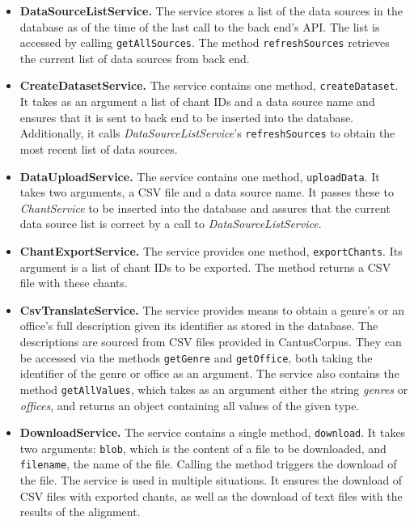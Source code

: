 \begin{itemize}
\item\textbf{DataSourceListService.} The service stores a list of the data sources in the database as of the time of the last call to the back end's API. The list
is accessed by calling \verb|getAllSources|. The method \verb|refreshSources| retrieves the current list of data sources from back end.

\item\textbf{CreateDatasetService.} The service contains one method, \verb|createDataset|. It takes as an argument a list of chant IDs and a data source name and
ensures that it is sent to back end to be inserted into the database. Additionally, it calls \emph{DataSourceListService}'s \verb|refreshSources| to obtain the
most recent list of data sources.

\item\textbf{DataUploadService.} The service contains one method, \verb|uploadData|. It takes two arguments, a CSV file and a data source name. It passes these to \emph{ChantService}
to be inserted into the database and assures that the current data source list is correct by a call to \emph{DataSourceListService}.

\item\textbf{ChantExportService.} The service provides one method, \verb|exportChants|. Its argument is a list of chant IDs to be exported. The method returns a CSV
file with these chants.

\item\textbf{CsvTranslateService.} The service provides means to obtain a genre's or an office's full description given its identifier as stored in the database.
The descriptions are sourced from CSV files provided in CantusCorpus. They can be accessed via the methods \verb|getGenre| and \verb|getOffice|, both
taking the identifier of the genre or office as an argument. The service also contains the method \verb|getAllValues|, which takes as an argument either
the string \emph{genres} or \emph{offices}, and returns an object containing all values of the given type.

\item\textbf{DownloadService.} The service contains a single method, \verb|download|. It takes two arguments: \verb|blob|, which is the content of a file to
be downloaded, and \verb|filename|, the name of the file. Calling the method triggers the download of the file. The service is used in multiple situations.
It ensures the download of CSV files with exported chants, as well as the download of text files with the results of the alignment.


\end{itemize}
